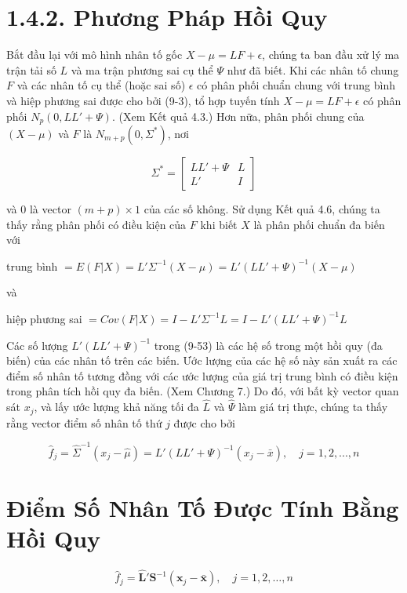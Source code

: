 \documentclass{article}
\begin{document}
\vspace{1cm}
\section*{1.4.2. Phương Pháp Hồi Quy}

Bắt đầu lại với mô hình nhân tố gốc \( X - \mu = LF + \epsilon \), chúng ta ban đầu xử lý ma trận tải số \( L \) và ma trận phương sai cụ thể \( \Psi \) như đã biết. Khi các nhân tố chung \( F \) và các nhân tố cụ thể (hoặc sai số) \( \epsilon \) có phân phối chuẩn chung với trung bình và hiệp phương sai được cho bởi (9-3), tổ hợp tuyến tính \( X - \mu = LF + \epsilon \) có phân phối \( N_p(0, LL' + \Psi) \). (Xem Kết quả 4.3.) Hơn nữa, phân phối chung của \( (X - \mu) \) và \( F \) là \( N_{m+p}(0, \Sigma^*) \), nơi

\[
\Sigma^* = \begin{bmatrix}
LL' + \Psi & L \\
L' & I
\end{bmatrix}
\]

và \( 0 \) là vector \( (m + p) \times 1 \) của các số không. Sử dụng Kết quả 4.6, chúng ta thấy rằng phân phối có điều kiện của \( F \) khi biết \( X \) là phân phối chuẩn đa biến với

trung bình \( = E(F|X) = L'\Sigma^{-1}(X - \mu) = L'(LL' + \Psi)^{-1}(X - \mu) \)

và

hiệp phương sai \( = Cov(F|X) = I - L'\Sigma^{-1}L = I - L'(LL' + \Psi)^{-1}L \)

Các số lượng \( L'(LL' + \Psi)^{-1} \) trong (9-53) là các hệ số trong một hồi quy (đa biến) của các nhân tố trên các biến. Ước lượng của các hệ số này sản xuất ra các điểm số nhân tố tương đồng với các ước lượng của giá trị trung bình có điều kiện trong phân tích hồi quy đa biến. (Xem Chương 7.) Do đó, với bất kỳ vector quan sát \( x_j \), và lấy ước lượng khả năng tối đa \( \hat{L} \) và \( \hat{\Psi} \) làm giá trị thực, chúng ta thấy rằng vector điểm số nhân tố thứ \( j \) được cho bởi

\[
\hat{f}_j = \hat{\Sigma}^{-1}(x_j - \hat{\mu}) = L'(LL' + \Psi)^{-1}(x_j - \bar{x}), \quad j = 1,2,...,n
\]

\section*{Điểm Số Nhân Tố Được Tính Bằng Hồi Quy}

\[
\hat{f}_j = \hat{\mathbf{L}}' \mathbf{S}^{-1} (\mathbf{x}_j - \bar{\mathbf{x}}), \quad j = 1,2,\ldots,n
\]
\end{document}
